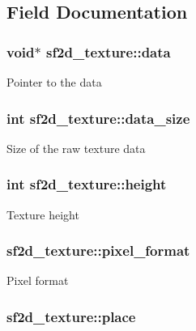\subsection{Field Documentation}
\hypertarget{structsf2d__texture_a46673c7ce439c63554a23e6ce83b254f}{
\subsubsection[{data}]{\setlength{\rightskip}{0pt plus 5cm}void$\ast$ sf2d\-\_\-texture\-::data}}\label{structsf2d__texture_a46673c7ce439c63554a23e6ce83b254f}
Pointer to the data \hypertarget{structsf2d__texture_a99107fa90e683bab6456da738ff9d005}{
\subsubsection[{data\-\_\-size}]{\setlength{\rightskip}{0pt plus 5cm}int sf2d\-\_\-texture\-::data\-\_\-size}}\label{structsf2d__texture_a99107fa90e683bab6456da738ff9d005}
Size of the raw texture data \hypertarget{structsf2d__texture_a055ccacd41038339dd1ded72747ccf8f}{
\subsubsection[{height}]{\setlength{\rightskip}{0pt plus 5cm}int sf2d\-\_\-texture\-::height}}\label{structsf2d__texture_a055ccacd41038339dd1ded72747ccf8f}
Texture height \hypertarget{structsf2d__texture_a1292c9a846b8593163bd3c1eaeb459c2}{
\subsubsection[{pixel\-\_\-format}]{ sf2d\-\_\-texture\-::pixel\-\_\-format}}\label{structsf2d__texture_a1292c9a846b8593163bd3c1eaeb459c2}
Pixel format \hypertarget{structsf2d__texture_ac30cfc2de337739d1a19858e4fdacaa4}{
\subsubsection[{place}]{ sf2d\-\_\-texture\-::place}}\label{structsf2d__texture_ac30cfc2de337739d1a19858e4fdacaa4}

